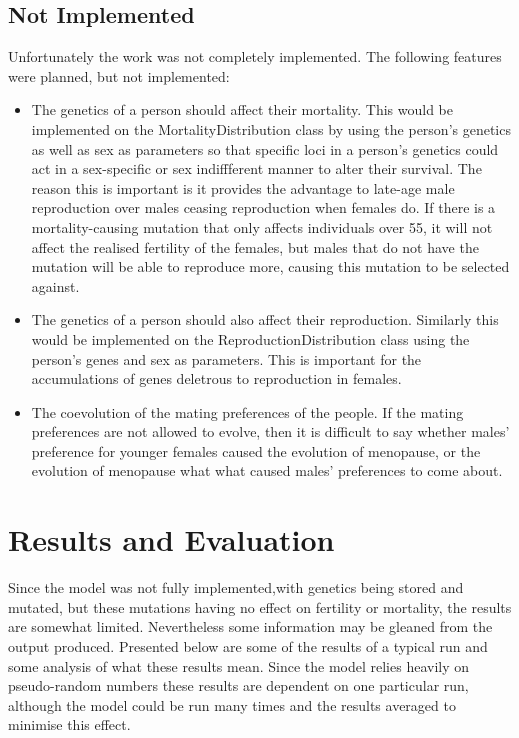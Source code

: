 \documentclass[authoryearcitations]{UoYCSproject}
\begin{document}
\newpage
\section{Not Implemented}
Unfortunately the work was not completely implemented. The following features were planned, but not implemented:

\begin{itemize}
\item The genetics of a person should affect their mortality. This would be implemented on the MortalityDistribution class by using the person's genetics as well as sex as parameters so that specific loci in a person's genetics could act in a sex-specific or sex indiffferent manner to alter their survival. The reason this is important is it provides the advantage to late-age male reproduction over males ceasing reproduction when females do. If there is a mortality-causing mutation that only affects individuals over 55, it will not affect the realised fertility of the females, but males that do not have the mutation will be able to reproduce more, causing this mutation to be selected against.
\item The genetics of a person should also affect their reproduction. Similarly this would be implemented on the ReproductionDistribution class using the person's genes and sex as parameters. This is important for the accumulations of genes deletrous to reproduction in females.
\item The coevolution of the mating preferences of the people. If the mating preferences are not allowed to evolve, then it is difficult to say whether males' preference for younger females caused the evolution of menopause, or the evolution of menopause what what caused males' preferences to come about. 
\end{itemize}


\chapter{Results and Evaluation}
\label{cha:Results and Evaluation}
Since the model was not fully implemented,with genetics being stored and mutated, but these mutations having no effect on fertility or mortality, the results are somewhat limited. Nevertheless some information may be gleaned from the output produced. Presented below are some of the results of a typical run and some analysis of what these results mean. Since the model relies heavily on pseudo-random numbers these results are dependent on one particular run, although the model could be run many times and the results averaged to minimise this effect.
\end{document}
